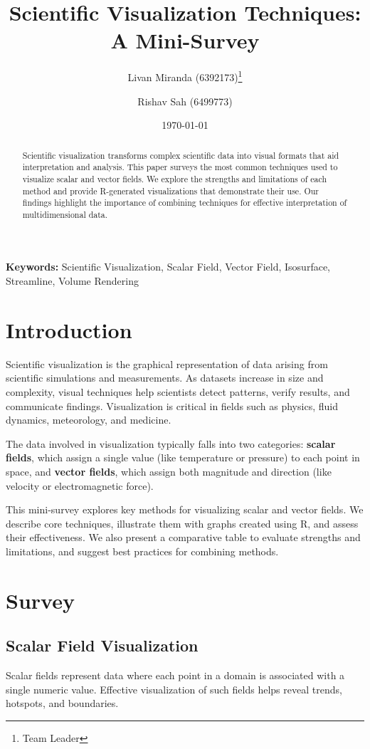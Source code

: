 \documentclass[11pt]{article}
\title{Scientific Visualization Techniques: A Mini-Survey}
\author{
	Livan Miranda (6392173)\thanks{Team Leader} \and
	Rishav Sah (6499773)
}
\date{\today}
\begin{document}
	
	\maketitle
	
	\begin{abstract}
		Scientific visualization transforms complex scientific data into visual formats that aid interpretation and analysis. This paper surveys the most common techniques used to visualize scalar and vector fields. We explore the strengths and limitations of each method and provide R-generated visualizations that demonstrate their use. Our findings highlight the importance of combining techniques for effective interpretation of multidimensional data.
	\end{abstract}
	
	\textbf{Keywords:} Scientific Visualization, Scalar Field, Vector Field, Isosurface, Streamline, Volume Rendering
	
	\section{Introduction}
	Scientific visualization is the graphical representation of data arising from scientific simulations and measurements. As datasets increase in size and complexity, visual techniques help scientists detect patterns, verify results, and communicate findings. Visualization is critical in fields such as physics, fluid dynamics, meteorology, and medicine.
	
	The data involved in visualization typically falls into two categories: \textbf{scalar fields}, which assign a single value (like temperature or pressure) to each point in space, and \textbf{vector fields}, which assign both magnitude and direction (like velocity or electromagnetic force).
	
	This mini-survey explores key methods for visualizing scalar and vector fields. We describe core techniques, illustrate them with graphs created using R, and assess their effectiveness. We also present a comparative table to evaluate strengths and limitations, and suggest best practices for combining methods.
	
	\section{Survey}
	
	\subsection{Scalar Field Visualization}
	Scalar fields represent data where each point in a domain is associated with a single numeric value. Effective visualization of such fields helps reveal trends, hotspots, and boundaries.
	
\end{document}
